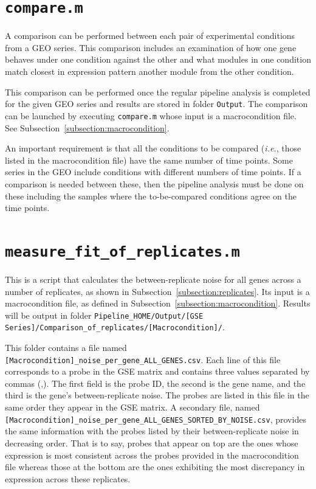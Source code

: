 \documentclass[final,letterpaper,12pt]{article}
\begin{document}
\section{\texttt{compare.m}}

\par A comparison can be performed between each pair of experimental conditions from a GEO series. This comparison includes an examination of how one gene behaves under one condition against the other and what modules in one condition match closest in expression pattern another module from the other condition.

\par This comparison can be performed once the regular pipeline analysis is completed for the given GEO series and results are stored in folder \texttt{Output}. The comparison can be launched by executing \texttt{compare.m} whose input is a macrocondition file. See Subsection~\ref{subsection:macrocondition}.

\par An important requirement is that all the conditions to be compared (\textit{i.e.}, those listed in the macrocondition file) have the same number of time points. Some series in the GEO include conditions with different numbers of time points. If a comparison is needed between these, then the pipeline analysis must be done on these including the samples where the to-be-compared conditions agree on the time points.

\section{\texttt{measure\_fit\_of\_replicates.m}}
\label{section:between_replicate_noise_m}

\par This is a script that calculates the between-replicate noise for all genes across a number of replicates, as shown in Subsection~\ref{subsection:replicates}. Its input is a macrocondition file, as defined in Subsection~\ref{subsection:macrocondition}. Results will be output in folder \texttt{Pipeline\_HOME/Output/[GSE Series]/Comparison\_of\_replicates/[Macrocondition]/}.

\par This folder contains a file named \texttt{[Macrocondition]\_noise\_per\_gene\_ALL\_GENES.csv}. Each line of this file corresponds to a probe in the GSE matrix and contains three values separated by commas (,). The first field is the probe ID, the second is the gene name, and the third is the gene's between-replicate noise. The probes are listed in this file in the same order they appear in the GSE matrix. A secondary file, named \texttt{[Macrocondition]\_noise\_per\_gene\_ALL\_GENES\_SORTED\_BY\_NOISE.csv}, provides the same information with the probes listed by their between-replicate noise in decreasing order. That is to say, probes that appear on top are the ones whose expression is most consistent across the probes provided in the macrocondition file whereas those at the bottom are the ones exhibiting the most discrepancy in expression across these replicates.
\end{document}
